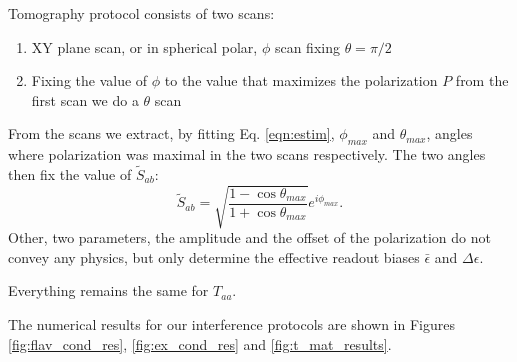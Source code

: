 \documentclass[two column]{article}
\begin{document}
Tomography protocol consists of two scans:\begin{enumerate}
    \item XY plane scan, or in spherical polar, $\phi$ scan fixing $\theta = \pi/2$
    \item Fixing the value of $\phi$ to the value that maximizes the polarization $P$ from the first scan we do a $\theta$ scan
\end{enumerate}
From the scans we extract, by fitting Eq. \ref{eqn:estim}, $\phi_{max}$ and $\theta_{max}$, angles where polarization was maximal in the two scans respectively. 
The two angles then fix the value of $\tilde{S}_{ab}$: $$\tilde{S}_{ab} = \sqrt{\frac{1-\cos{\theta_{max}}}{1+\cos{\theta_{max}}}}e^{i\phi_{max}}.$$
Other, two parameters, the amplitude and the offset of the polarization do not convey any physics, but only determine the effective readout biases $\bar{\epsilon}$ and $\Delta\epsilon$.

Everything remains the same for $T_{aa}$.

The numerical results for our interference protocols are shown in Figures \ref{fig:flav_cond_res}, \ref{fig:ex_cond_res} and \ref{fig:t_mat_results}.
\end{document}
